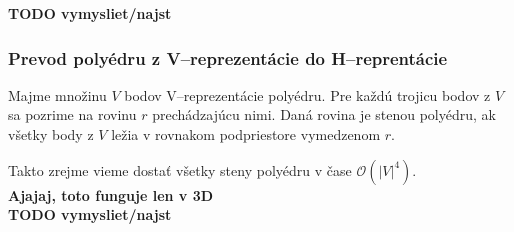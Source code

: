 \textbf{TODO vymysliet/najst}

\subsubsection{Prevod polyédru z V--reprezentácie do H--reprentácie}

Majme množinu $V$ bodov V--reprezentácie polyédru. Pre každú trojicu bodov z $V$ sa pozrime na rovinu $r$ prechádzajúcu nimi. Daná rovina je stenou polyédru, ak všetky body z $V$ ležia v rovnakom podpriestore vymedzenom $r$.

Takto zrejme vieme dostať všetky steny polyédru v čase $\mathcal{O}(|V|^4)$.\\

\textbf{Ajajaj, toto funguje len v 3D}\\

\textbf{TODO vymysliet/najst}
